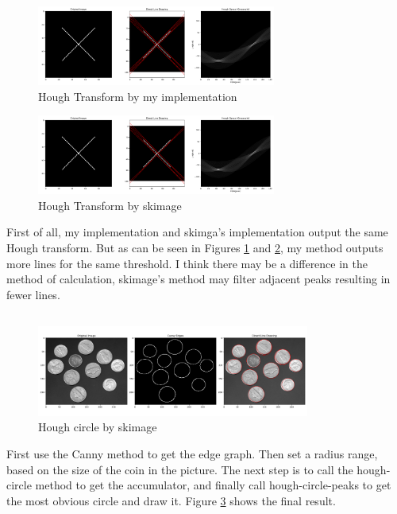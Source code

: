 \documentclass[12pt]{article}
\begin{document}
\subsection{}
\begin{figure}[ht]
    \centering
    \includegraphics[width=0.7\textwidth]{pics/A7_3.2_1.png} 
    \caption{Hough Transform by my implementation}
    \label{fig: Figure 6}
\end{figure}
\begin{figure}[ht]
    \centering
    \includegraphics[width=0.7\textwidth]{pics/A7_3.2_2.png} 
    \caption{Hough Transform by skimage}
    \label{fig: Figure 7}
\end{figure}
First of all, my implementation and skimga's implementation output the same Hough transform.
But as can be seen in Figures \ref{fig: Figure 6} and \ref{fig: Figure 7}, my method outputs more lines for the same threshold.
I think there may be a difference in the method of calculation, skimage's method may filter adjacent peaks resulting in fewer lines.
\subsection{}
\begin{figure}[ht]
    \centering
    \includegraphics[width=0.8\textwidth]{pics/A7_3.3.png} 
    \caption{Hough circle by skimage}
    \label{fig: Figure 8}
\end{figure}
First use the Canny method to get the edge graph.
Then set a radius range, based on the size of the coin in the picture. 
The next step is to call the hough-circle method to get the accumulator, and finally call hough-circle-peaks to get the most obvious circle and draw it.
Figure \ref{fig: Figure 8} shows the final result.
\end{document}
